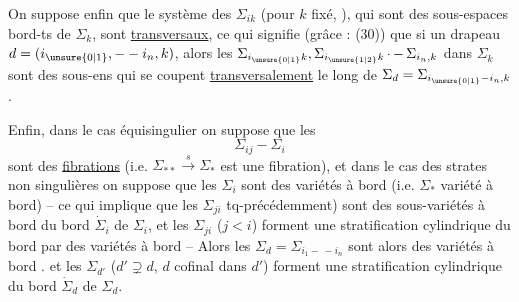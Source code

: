 On suppose enfin que le système des $\Sigma_{ik}$ (pour $k$ fixé, ), qui sont des sous-espaces  bord-ts de $\Sigma_k$, sont \uline{transversaux}, ce qui signifie (grâce : (30)) que si  un drapeau $d=(i_{\unsure{0|1}},--i_n,k)$, alors les $\Sigma_{i_{\unsure{0|1}}k},\Sigma_{i_{\unsure{1|2}}k}\mathinner{\cdotp-}\Sigma_{i_n,k}$ dans $\Sigma_k$ sont des sous-ens  qui se coupent \uline{transversalement} le long de $\Sigma_d=\Sigma_{i_{\unsure{0|1}}-i_n,k}$.

Enfin, dans le cas équisingulier on suppose que les
\[
\Sigma_{ij}-\Sigma_i
\]
sont des \uline{fibrations} (i.e. $\Sigma_{**}\xrightarrow{s}\Sigma_*$ est une fibration), et dans le cas des strates non singulières on suppose que les $\Sigma_i$ sont des variétés à bord (i.e. $\Sigma_*$ variété à bord) -- ce qui implique que les $\Sigma_{ji}$  tq-précédemment) sont des sous-variétés à bord du  bord $\dot\Sigma_i$ de $\Sigma_i$, et les $\Sigma_{ji}$ ($j<i$) forment  une stratification cylindrique \margin{$*$}du \deleted{$\unsure{\Sigma_*}$} bord par des variétés à bord -- Alors les $\Sigma_d=\Sigma_{i_1-\, -i_n}$ sont alors des variétés à bord . et les $\Sigma_{d'}$ ($d'\supsetneq d$, $d$ cofinal dans $d'$)  forment une stratification cylindrique du bord  $\dot\Sigma_d$ de $\Sigma_d$.

